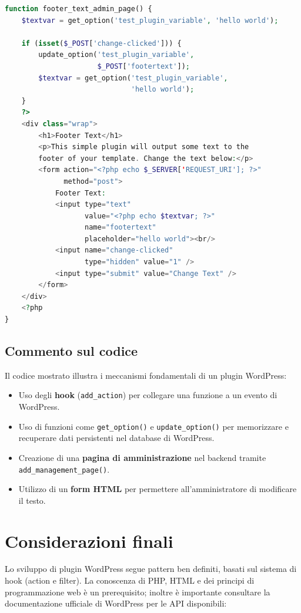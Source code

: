\begin{lstlisting}[language=PHP]
function footer_text_admin_page() {
    $textvar = get_option('test_plugin_variable', 'hello world');

    if (isset($_POST['change-clicked'])) {
        update_option('test_plugin_variable',
                      $_POST['footertext']);
        $textvar = get_option('test_plugin_variable',
                              'hello world');
    }
    ?>
    <div class="wrap">
        <h1>Footer Text</h1>
        <p>This simple plugin will output some text to the
        footer of your template. Change the text below:</p>
        <form action="<?php echo $_SERVER['REQUEST_URI']; ?>"
              method="post">
            Footer Text:
            <input type="text"
                   value="<?php echo $textvar; ?>"
                   name="footertext"
                   placeholder="hello world"><br/>
            <input name="change-clicked"
                   type="hidden" value="1" />
            <input type="submit" value="Change Text" />
        </form>
    </div>
    <?php
}
\end{lstlisting}

\subsection{Commento sul codice}

Il codice mostrato illustra i meccanismi fondamentali di un plugin WordPress:

\begin{itemize}
    \item Uso degli \textbf{hook} (\texttt{add\_action}) per collegare una funzione a un evento di WordPress.
    \item Uso di funzioni come \texttt{get\_option()} e \texttt{update\_option()} per memorizzare e recuperare dati persistenti nel database di WordPress.
    \item Creazione di una \textbf{pagina di amministrazione} nel backend tramite \texttt{add\_management\_page()}.
    \item Utilizzo di un \textbf{form HTML} per permettere all'amministratore di modificare il testo.
\end{itemize}

\section{Considerazioni finali}

Lo sviluppo di plugin WordPress segue pattern ben definiti, basati sul sistema di hook (action e filter). La conoscenza di PHP, HTML e dei principi di programmazione web è un prerequisito; inoltre è importante consultare la documentazione ufficiale di WordPress per le API disponibili:

